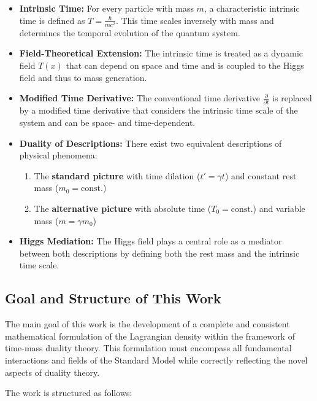 \documentclass{article}
\theoremstyle{definition}
\theoremstyle{remark}
\newcommand{\Tfield}{T(x)} %
\begin{document}
	\begin{itemize}
		\item \textbf{Intrinsic Time:} For every particle with mass $m$, a characteristic intrinsic time is defined as $T = \frac{\hbar}{mc^2}$. This time scales inversely with mass and determines the temporal evolution of the quantum system.
		
		\item \textbf{Field-Theoretical Extension:} The intrinsic time is treated as a dynamic field $\Tfield$ that can depend on space and time and is coupled to the Higgs field and thus to mass generation.
		
		\item \textbf{Modified Time Derivative:} The conventional time derivative $\frac{\partial}{\partial t}$ is replaced by a modified time derivative that considers the intrinsic time scale of the system and can be space- and time-dependent.
		
		\item \textbf{Duality of Descriptions:} There exist two equivalent descriptions of physical phenomena:
		\begin{enumerate}
			\item The \textbf{standard picture} with time dilation ($t' = \gamma t$) and constant rest mass ($m_0 = \text{const.}$)
			\item The \textbf{alternative picture} with absolute time ($T_0 = \text{const.}$) and variable mass ($m = \gamma m_0$)
		\end{enumerate}
		
		\item \textbf{Higgs Mediation:} The Higgs field plays a central role as a mediator between both descriptions by defining both the rest mass and the intrinsic time scale.
	\end{itemize}
	
	\subsection{Goal and Structure of This Work}
	
	The main goal of this work is the development of a complete and consistent mathematical formulation of the Lagrangian density within the framework of time-mass duality theory. This formulation must encompass all fundamental interactions and fields of the Standard Model while correctly reflecting the novel aspects of duality theory.
	
	The work is structured as follows:
	
\end{document}
